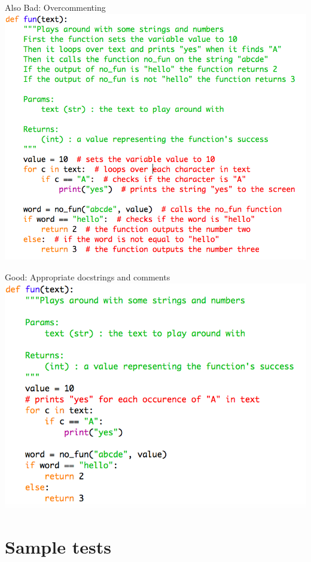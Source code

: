 \documentclass[week2]{csse1001}
\begin{document}
\begin{topic}{Also Bad: Overcommenting}
\includegraphics[height=\textheight]{bad_python/bad_comments}
\end{topic}

\begin{topic}{Good: Appropriate docstrings and comments}
\includegraphics[height=\textheight]{bad_python/good_comments}
\end{topic}

\section{Sample tests}
\end{document}
